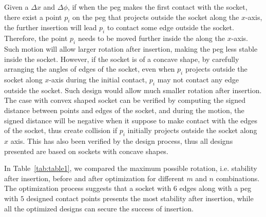 \documentclass[letterpaper, 10 pt, conference]{ieeeconf}
\begin{document}
Given a $\Delta x$ and $\Delta\phi$, if when the peg makes the first contact with the socket, there exist a point $p_i$ on the peg that projects outside the socket along the $x$-axis, the further insertion will lead $p_i$ to contact some edge outside the socket. Therefore, the point $p_i$ needs to be moved further inside the along the $x$-axis. Such motion will allow larger rotation after insertion, making the peg less stable inside the socket. However, if the socket is of a concave shape, by carefully arranging the angles of edges of the socket, even when $p_i$ projects outside the socket along $x$-axis during the initial contact, $p_i$ may not contact any edge outside the socket. Such design would allow much smaller rotation after insertion. The case with convex shaped socket can be verified by computing the signed distance between points and edges of the socket, and during the motion, the signed distance will be negative when it suppose to make contact with the edges of the socket, thus create collision if $p_i$ initially projects outside the socket along $x$ axis. This has also been verified by the design process, thus all designs presented are based on sockets with concave shapes. 

In Table~\ref{tab:table1}, we compared the maximum possible rotation, i.e. stability after insertion, before and after optimization for different $m$ and $n$ combinations. The optimization process suggests that a socket with $6$ edges along with a peg with $5$ designed contact points presents the most stability after insertion, while all the optimized designs can secure the success of insertion. 


\end{document}
